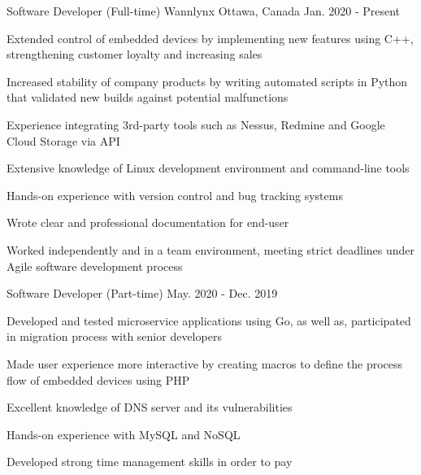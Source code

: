 

\begin{cventries}

  \cventry
    {Software Developer (Full-time)} %
    {Wannlynx} %
    {Ottawa, Canada} %
    {Jan. 2020 - Present} %
    {
      \begin{cvitems} %
        \item{Extended control of embedded devices by implementing new features using C++, strengthening customer loyalty and increasing sales}
        \item{Increased stability of company products by writing automated scripts in Python that validated new builds against potential malfunctions}
        \item{Experience integrating 3rd-party tools such as Nessus, Redmine and Google Cloud Storage via API}
        \item{Extensive knowledge of Linux development environment and command-line tools}
        \item{Hands-on experience with version control and bug tracking systems}
        \item{Wrote clear and professional documentation for end-user}
        \item{Worked independently and in a team environment, meeting strict deadlines under Agile software development process}
      \end{cvitems}
    }
    
  \cventry
    {Software Developer (Part-time)} %
    {} %
    {} %
    {May. 2020 - Dec. 2019} %
    {
      \begin{cvitems} %
        \item{Developed and tested microservice applications using Go, as well as, participated in migration process with senior developers}
        \item{Made user experience more interactive by creating macros to define the process flow of embedded devices using PHP}
        \item{Excellent knowledge of DNS server and its vulnerabilities} 
        \item{Hands-on experience with MySQL and NoSQL}
        \item{Developed strong time management skills in order to pay } 
      \end{cvitems}
    }


\end{cventries}
